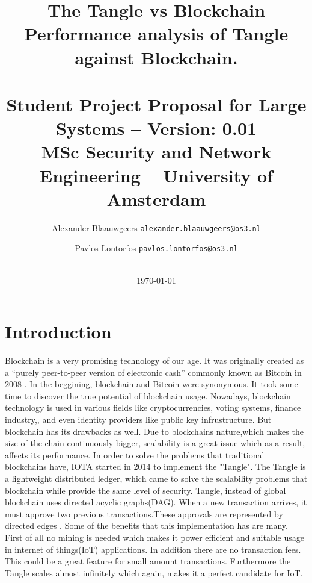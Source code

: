 \documentclass[journal]{IEEEtran}
\begin{document}
    \title{The Tangle vs Blockchain\\ \Large{Performance analysis of Tangle against Blockchain.} \\~\\ 
    \large{Student Project Proposal for Large Systems -- \textbf{Version:} 0.01
    \\MSc Security and Network Engineering -- University of Amsterdam\\}}
    \author{
        Alexander Blaauwgeers \texttt{alexander.blaauwgeers@os3.nl} \\ \and
        Pavlos Lontorfos \texttt{pavlos.lontorfos@os3.nl} %
    }

	\date{
	\\ \textnormal \today
	}
	\maketitle
	\setlength{\parindent}{0pt}

%
	\newpage

	
\section{Introduction} 
Blockchain is a very promising technology of our age. It was originally created as  a “purely peer-to-peer version of electronic cash” commonly known as Bitcoin in 2008 \cite{forbesHistory}. In the beggining, blockchain and Bitcoin were synonymous. It took some time to discover the true potential of blockchain usage. Nowadays, blockchain technology is used in various fields like cryptocurrencies, voting systems, finance industry,\cite{Xavier+2016}, and even identity providers like public key infrustructure\cite{Rajneesh2018}. But blockchain has its drawbacks as well. Due to blockchains nature,which makes the size of the chain continuously bigger, scalability is a great issue which as a result, affects its performance\cite{baliga2018performance}. 
In order to solve the problems that traditional blockchains have, IOTA started in 2014 to implement the "Tangle". The Tangle is a lightweight distributed ledger, which came to solve the scalability problems that blockchain while provide the same level of security. Tangle, instead of global blockchain uses directed acyclic graphs(DAG). When a new transaction arrives, it must approve two previous transactions.These approvals are represented by directed edges \cite{popov2016tangle}. Some of the benefits that this implementation has are many. First of all no mining is needed which makes it power efficient and suitable usage in internet of things(IoT) applications. In addition there are no transaction fees. This could be a great feature for small amount transactions. Furthermore the Tangle scales almost infinitely which again, makes it a perfect candidate for IoT\cite{Tangler}.
\end{document}
